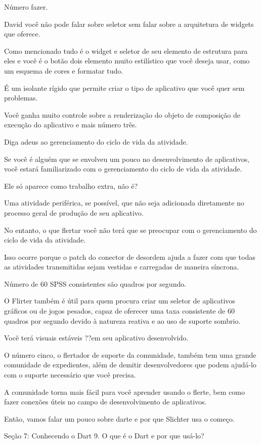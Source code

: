 Número fazer.

David você não pode falar sobre seletor sem falar sobre a arquitetura de widgets que oferece.

Como mencionado tudo é o widget e seletor de seu elemento de estrutura para eles e você é o botão dois elemento muito estilístico que você deseja usar, como um esquema de cores e formatar tudo.

É um isolante rígido que permite criar o tipo de aplicativo que você quer sem problemas.

Você ganha muito controle sobre a renderização do objeto de composição de execução do aplicativo e mais número três.

Diga adeus ao gerenciamento do ciclo de vida da atividade.

Se você é alguém que se envolveu um pouco no desenvolvimento de aplicativos, você estará familiarizado com o gerenciamento do ciclo de vida da atividade.

Ele só aparece como trabalho extra, não é?

Uma atividade periférica, se possível, que não seja adicionada diretamente no processo geral de produção de seu aplicativo.

No entanto, o que flertar você não terá que se preocupar com o gerenciamento do ciclo de vida da atividade.

Isso ocorre porque o patch do conector de desordem ajuda a fazer com que todas as atividades transmitidas sejam vestidas e carregadas de maneira síncrona.

Número de 60 SPSS consistentes são quadros por segundo.

O Flirter também é útil para quem procura criar um seletor de aplicativos gráficos ou de jogos pesados, capaz de oferecer uma taxa consistente de 60 quadros por segundo devido à natureza reativa e ao uso de suporte sombrio.

Você terá visuais estáveis ??em seu aplicativo desenvolvido.

O número cinco, o flertador de suporte da comunidade, também tem uma grande comunidade de expedientes, além de demitir desenvolvedores que podem ajudá-lo com o suporte necessário que você precisa.

A comunidade torna mais fácil para você aprender usando o flerte, bem como fazer conexões úteis no campo de desenvolvimento de aplicativos.

Então, vamos falar um pouco sobre darte e por que Slichter usa o começo.

Seção 7: Conhecendo o Dart
9. O que é o Dart e por que usá-lo?

